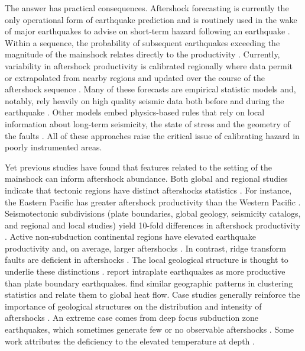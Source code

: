 \documentclass[draft, jgrga]{agujournal2018}
\begin{document}
The answer has practical consequences. Aftershock forecasting is currently the only operational form of earthquake prediction and is routinely used in the wake of major earthquakes to advise on short-term hazard following an earthquake \citep{Reasenberg1989, Page,Hardebeck2018UpdatedParameters}. Within a sequence, the probability of subsequent earthquakes exceeding the magnitude of the mainshock relates directly to the productivity \citep{Reasenberg1989, Reasenberg1999ForeshockEarthquakes}. Currently, variability in aftershock productivity is calibrated regionally where data permit or extrapolated from nearby regions and updated over the course of the aftershock sequence \citep[e.g.][]{Reasenberg1989, Reasenberg1999ForeshockEarthquakes, ogata2017statistics}. Many of these forecasts are empirical statistic models and, notably, rely heavily on high quality seismic data both before and during the earthquake \citep{Gerstenberger2005Real-timeCalifornia, Omi2015Intermediate-termApproaches}. Other models embed physics-based rules that rely on local information about long-term seismicity, the state of stress and the geometry of the faults \citep[e.g.][]{Segou2016ProspectiveMainshock, Field2017AForecast}. All of these approaches raise the critical issue of calibrating hazard in poorly instrumented areas.

Yet previous studies have found that features related to the setting of the mainshock can inform aftershock abundance. Both global and regional studies indicate that tectonic regions have distinct aftershocks statistics \citep{Chu2011, Page, Davidsen2015GeneralizedCalifornia, Tahir2014Aftershock2005, ogata2017statistics}. For instance, the Eastern Pacific has greater aftershock productivity than the Western Pacific \citep{Singh1911, Wetzler2016}. Seismotectonic subdivisions (plate boundaries, global geology, seismicity catalogs, and regional and local studies) yield 10-fold differences in aftershock productivity \citep{Page}. Active non-subduction continental regions have elevated earthquake productivity and, on average, larger aftershocks \citep{Page, Mogi1967, Davis1991Single-linkVariations}. In contrast, ridge transform faults are deficient in aftershocks \citep{Davis1991Single-linkVariations, Boettcher2004EarthquakeFaults, McGuire2005}. The local geological structure is thought to underlie these distinctions \citep{Boettcher2004EarthquakeFaults, McCloskey2003StructuralAftershocks}. \citet{Yamanaka1990scalingshock} report intraplate earthquakes as more productive than plate boundary earthquakes. \citet{Zaliapin2016AClusters} find similar geographic patterns in clustering statistics and relate them to global heat flow. Case studies generally reinforce the importance of geological structures on the distribution and intensity of aftershocks \citep{Das2003SpatialDistribution, McCloskey2003StructuralAftershocks}. An extreme case comes from deep focus subduction zone earthquakes, which sometimes generate few or no observable aftershocks \citep{Bath1965LateralMantle, Frohlich1989TheEarthquakes, Nyffenegger2000, Wiens1997AftershockZone, Wu1999, Houston2004}. Some work attributes the deficiency to the elevated temperature at depth \citep{Nyffenegger2000, Houston2004}. 
\end{document}
